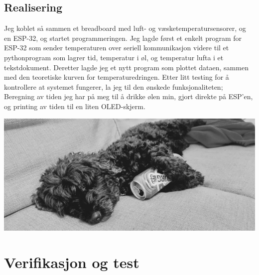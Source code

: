 \documentclass{article}
\begin{document}
\subsection{Realisering}
Jeg koblet så sammen et breadboard med luft- og væsketemperatursensorer, og en ESP-32, og startet programmeringen.
Jeg lagde først et enkelt program for ESP-32 som sender temperaturen over seriell kommunikasjon videre til et pythonprogram som lagrer tid, temperatur i øl, og temperatur lufta i et tekstdokument. Deretter lagde jeg et nytt program som plottet dataen, sammen med den teoretiske kurven for temperaturedringen.
Etter litt testing for å kontrollere at systemet fungerer, la jeg til den ønskede funksjonaliteten; Beregning av tiden jeg har på meg til å drikke ølen min, gjort direkte på ESP'en, og printing av tiden til en liten OLED-skjerm.
\vfill
\begin{center}
    \includegraphics[width=15cm]{Tinka_med_pils.jpg}
\end{center}
\newpage
\section{Verifikasjon og test}
\end{document}
